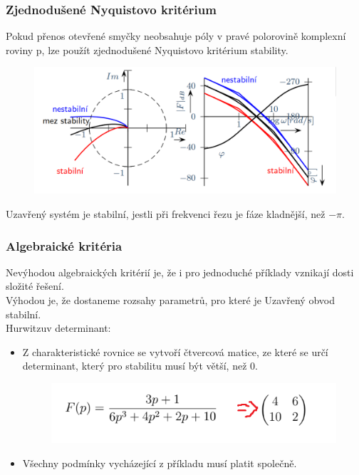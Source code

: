 \subsubsection*{Zjednodušené Nyquistovo kritérium}
Pokud přenos otevřené smyčky neobsahuje póly v pravé polorovině komplexní roviny p, lze použít zjednodušené Nyquistovo kritérium stability.\\
\begin{figure}[H]
    \includegraphics*[scale = 0.4]{images/NyQuistZjednoduseny.png}
\end{figure}

Uzavřený systém je stabilní, jestli při frekvenci řezu je fáze kladnější, než $-\pi$.\\

\subsubsection*{Algebraické kritéria}
Nevýhodou algebraických kritérií je, že i pro jednoduché příklady vznikají dosti složité řešení.\\
Výhodou je, že dostaneme rozsahy parametrů, pro které je Uzavřený obvod stabilní.\\
Hurwitzuv determinant:
\begin{itemize}
    \item Z charakteristické rovnice se vytvoří čtvercová matice, ze které se určí determinant, který pro stabilitu musí být větší, než 0.
          \begin{figure}[H]
              \includegraphics*[scale = 1.2]{images/Hurwitz.png}
          \end{figure}
    \item Všechny podmínky vycházející z příkladu musí platit společně.
\end{itemize}



